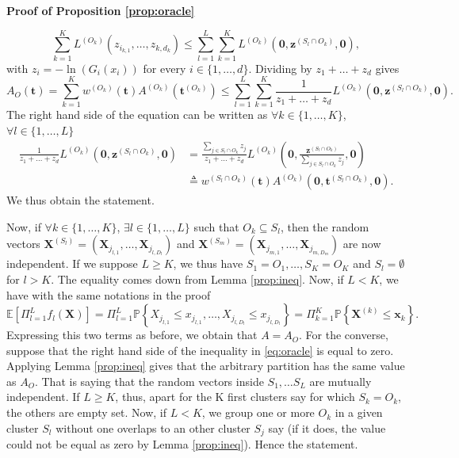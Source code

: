 \documentclass[11pt]{article}
\makeatletter
\theoremstyle{definition}
\renewenvironment{proof}[1][\proofname]{\par
\pushQED{\qed}%
\normalfont \topsep6\p@\@plus6\p@\relax
\trivlist
\item\relax
{\textbf{
#1\@addpunct{ }}}\hspace\labelsep\ignorespaces
}{%
\popQED\endtrivlist\@endpefalse
}
\makeatother
\begin{document}
\begin{proof}[Proof of Proposition \ref{prop:oracle}]
		\begin{equation*}
			\sum_{k=1}^K L^{(O_k)}(z_{i_{k,1}},\dots, z_{k,d_k}) \leq \sum_{l=1}^L \sum_{k=1}^K L^{(O_k)}(\textbf{0}, \textbf{z}^{(S_l \cap O_k)}, \textbf{0}),
		\end{equation*}
		with $z_i = -\ln (G_i(x_i))$ for every $i \in \{1, \dots, d\}$. Dividing by $z_1 + \dots + z_d$ gives
		\begin{equation*}
			A_{O} (\textbf{t}) = \sum_{k=1}^K w^{(O_k)}(\textbf{t}) A^{(O_k)}(\textbf{t}^{(O_k)}) \leq \sum_{l=1}^L \sum_{k=1}^K \frac{1}{z_1+\dots+z_d}L^{(O_k)}(\textbf{0}, \textbf{z}^{(S_l \cap O_k)}, \textbf{0}).
		\end{equation*}
		The right hand side of the equation can be written as $\forall k \in \{1,\dots, K\}$, $\forall l \in \{1,\dots, L\}$
		\begin{align*}
			\frac{1}{z_1 + \dots + z_d} L^{(O_k)}(\textbf{0}, \textbf{z}^{(S_l \cap O_k)}, \textbf{0}) &= \frac{\sum_{j \in S_l \cap O_k} z_j}{z_1 + \dots + z_d} L^{(O_k)}\left(\textbf{0}, \frac{\textbf{z}^{(S_l \cap O_k)}}{\sum_{j \in S_l \cap O_k} z_j}, \textbf{0}\right) \\
			&\triangleq w^{(S_l \cap O_k)}(\textbf{t}) A^{(O_k)}(\textbf{0}, \textbf{t}^{(S_l \cap O_k)}, \textbf{0}).
		\end{align*}
		We thus obtain the statement.
		
		
		Now, if $\forall k \in \{1,\dots, K\}$, $\exists l \in \{1, \dots, L\}$ such that $O_k \subseteq S_l$, then the random vectors $\textbf{X}^{(S_l)} = (\textbf{X}_{j_{l,1}}, \dots, \textbf{X}_{j_{l,D_l}})$ and $\textbf{X}^{(S_m)} = (\textbf{X}_{j_{m,1}}, \dots, \textbf{X}_{j_{m,D_m}})$ are now independent. If we suppose $L \geq K$, we thus have $S_1 = O_1, \dots, S_K = O_K$ and $S_{l} = \emptyset$ for $l > K$. The equality comes down from Lemma \ref{prop:ineq}. Now, if $L < K$, we have with the same notations in the proof
		\begin{equation*}
			\mathbb{E}\left[ \Pi_{l=1}^L f_l(\textbf{X}) \right] = \Pi_{l=1}^L \mathbb{P}\left\{ X_{j_{l,1}} \leq x_{j_{l,1}}, \dots, X_{j_{l,D_l}} \leq x_{j_{l,D_l}}\right\} = \Pi_{k=1}^K \mathbb{P}\left\{ \textbf{X}^{(k)} \leq \textbf{x}_k \right\}.
		\end{equation*}
		Expressing this two terms as before, we obtain that $A = A_{O}$. For the converse, suppose that the right hand side of the inequality in \eqref{eq:oracle} is equal to zero. Applying Lemma \ref{prop:ineq} gives that the arbitrary partition has the same value as $A_{O}$. That is saying that the random vectors inside $S_1, \dots S_L$ are mutually independent. If $L \geq K$, thus, apart for the K first clusters say for which $S_k = O_k$, the others are empty set. Now, if $L < K$, we group one or more $O_k$ in a given cluster $S_l$ without one overlaps to an other cluster $S_j$ say (if it does, the value could not be equal as zero by Lemma \ref{prop:ineq}). Hence the statement.
	\end{proof}
	
\end{document}
